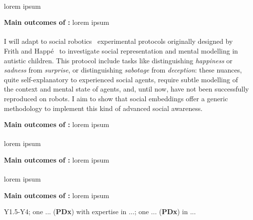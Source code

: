 \paragraph{\TDA}

lorem ipsum

\begin{framed}
    {\noindent\bf Main outcomes of \tDA:} lorem ipsum 
\end{framed}

\paragraph{\TDB}

I will adapt to social
robotics~\cite{lemaignan2015mutual} experimental protocols originally designed
by Frith and Happé~\cite{frith1994autism} to investigate social representation
and mental modelling in autistic children.  This protocol include tasks like
distinguishing \emph{happiness} or \emph{sadness} from \emph{surprise}, or
distinguishing \emph{sabotage} from \emph{deception}: these nuances, quite
self-explanatory to experienced social agents, require subtle modelling of the
context and mental state of agents, and, until now, have not been successfully
reproduced on robots. I aim to show that social embeddings offer a generic
methodology to implement this kind of advanced social awareness.


\begin{framed}
    {\noindent\bf Main outcomes of \tDB:} lorem ipsum 
\end{framed}

\paragraph{\TDD}

lorem ipsum

\begin{framed}
    {\noindent\bf Main outcomes of \tDD:} lorem ipsum 
\end{framed}


\paragraph{\TDC}

lorem ipsum

\begin{framed}
    {\noindent\bf Main outcomes of \tDC:} lorem ipsum 
\end{framed}


\begin{framed}
     Y1.5-Y4; one ... ({\bf PDx}) with expertise in
    ...; one ... ({\bf PDx}) in ...
\end{framed}


